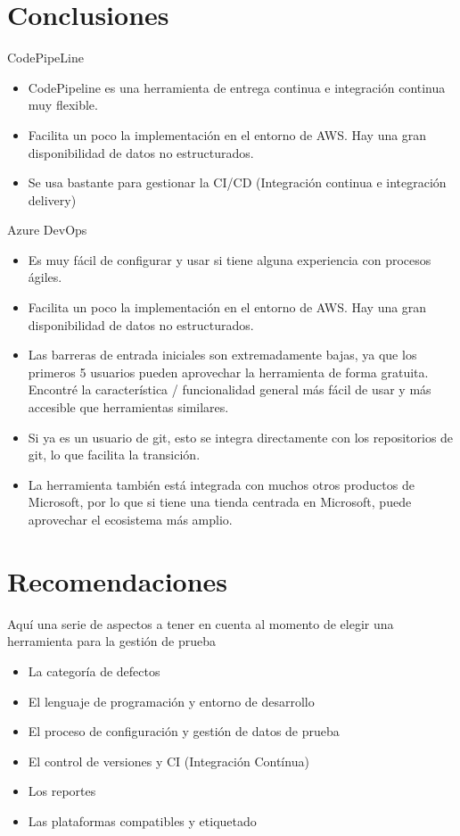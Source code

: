 \documentclass[12pt,letterpaper]{article}
\begin{document}
\section{Conclusiones}
CodePipeLine
\begin{itemize}
    \item CodePipeline es una herramienta de entrega continua e integración continua muy flexible.
    \item Facilita un poco la implementación en el entorno de AWS. Hay una gran disponibilidad de datos no estructurados.
    \item Se usa bastante para gestionar la CI/CD (Integración continua e integración delivery)
    
\end{itemize}
Azure DevOps
\begin{itemize}
    \item Es muy fácil de configurar y usar si tiene alguna experiencia con procesos ágiles.     \item Facilita un poco la implementación en el entorno de AWS. Hay una gran disponibilidad de datos no estructurados.
    \item Las barreras de entrada iniciales son extremadamente bajas, ya que los primeros 5 usuarios pueden aprovechar la herramienta de forma gratuita. Encontré la característica / funcionalidad general más fácil de usar y más accesible que herramientas similares. 
    \item Si ya es un usuario de git, esto se integra directamente con los repositorios de git, lo que facilita la transición. 
    \item La herramienta también está integrada con muchos otros productos de Microsoft, por lo que si tiene una tienda centrada en Microsoft, puede aprovechar el ecosistema más amplio.
\end{itemize}

\section{Recomendaciones}
Aquí una serie de aspectos a tener en cuenta al momento de elegir una herramienta para la gestión de prueba
\begin{itemize}
    \item	La categoría de defectos
    \item	El lenguaje de programación y entorno de desarrollo
    \item	El proceso de configuración y gestión de datos de prueba
    \item	El control de versiones y CI (Integración Contínua)
    \item	Los reportes
    \item	Las plataformas compatibles y etiquetado

\end{itemize}
\end{document}
